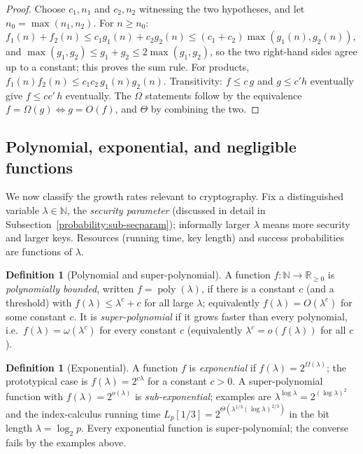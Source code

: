 \documentclass[11pt,a4paper]{article}
\theoremstyle{definition}
\newtheorem{definition}[theorem]{Definition}
\theoremstyle{remark}
\newcommand{\N}{\ensuremath{\mathbb{N}}}
\newcommand{\R}{\ensuremath{\mathbb{R}}}
\DeclareMathOperator{\poly}{poly}
\begin{document}
\begin{proof}
Choose \(c_1, n_1\) and \(c_2, n_2\) witnessing the two hypotheses, and let \(n_0 = \max(n_1, n_2)\). For \(n \ge n_0\): \(f_1(n) + f_2(n) \le c_1 g_1(n) + c_2 g_2(n) \le (c_1 + c_2)\max(g_1(n), g_2(n))\), and \(\max(g_1, g_2) \le g_1 + g_2 \le 2\max(g_1,g_2)\), so the two right-hand sides agree up to a constant; this proves the sum rule. For products, \(f_1(n) f_2(n) \le c_1 c_2\, g_1(n) g_2(n)\). Transitivity: \(f \le c\,g\) and \(g \le c' h\) eventually give \(f \le cc'\,h\) eventually. The \(\Omega\) statements follow by the equivalence \(f = \Omega(g) \Leftrightarrow g = O(f)\), and \(\Theta\) by combining the two.
\end{proof}

\subsection{Polynomial, exponential, and negligible functions}

We now classify the growth rates relevant to cryptography. Fix a distinguished variable \(\lambda \in \N\), the \emph{security parameter} (discussed in detail in Subsection~\ref{probability:sub-secparam}); informally larger \(\lambda\) means more security and larger keys. Resources (running time, key length) and success probabilities are functions of \(\lambda\).

\begin{definition}[Polynomial and super-polynomial]\label{probability:def-poly}
A function \(f\colon \N \to \R_{\ge 0}\) is \emph{polynomially bounded}, written \(f = \poly(\lambda)\), if there is a constant \(c\) (and a threshold) with \(f(\lambda) \le \lambda^c + c\) for all large \(\lambda\); equivalently \(f(\lambda) = O(\lambda^c)\) for some constant \(c\). It is \emph{super-polynomial} if it grows faster than every polynomial, i.e.\ \(f(\lambda) = \omega(\lambda^c)\) for every constant \(c\) (equivalently \(\lambda^c = o(f(\lambda))\) for all \(c\)).
\end{definition}

\begin{definition}[Exponential]\label{probability:def-exp-fn}
A function \(f\) is \emph{exponential} if \(f(\lambda) = 2^{\Omega(\lambda)}\); the prototypical case is \(f(\lambda) = 2^{c\lambda}\) for a constant \(c > 0\). A super-polynomial function with \(f(\lambda) = 2^{o(\lambda)}\) is \emph{sub-exponential}; examples are \(\lambda^{\log \lambda} = 2^{(\log\lambda)^2}\) and the index-calculus running time \(L_p[1/3] = 2^{\Theta(\lambda^{1/3} (\log \lambda)^{2/3})}\) in the bit length \(\lambda = \log_2 p\). Every exponential function is super-polynomial; the converse fails by the examples above.
\end{definition}
\end{document}
